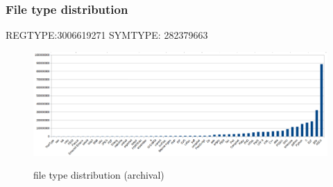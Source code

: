 \subsubsection{File type distribution}

REGTYPE:3006619271
SYMTYPE: 282379663

\begin{figure}
	\centering
	\includegraphics[width=1\textwidth]{graphs/file_type.png}\\
	\caption{file type distribution (archival)}\label{xxx}
\end{figure}

